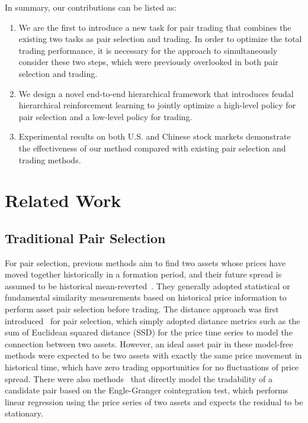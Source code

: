 \documentclass[sigconf]{acmart}
\begin{document}
In summary, our contributions can be listed as:
\begin{enumerate}
\item We are the first to introduce a new task for pair trading that combines the existing two tasks as pair selection and trading. In order to optimize the total trading performance, it is necessary for the approach to simultaneously consider these two steps, which were previously overlooked in both pair selection and trading.
\item We design a novel end-to-end hierarchical framework that introduces feudal hierarchical reinforcement learning to jointly optimize a high-level policy for pair selection and a low-level policy for trading.
\item Experimental results on both U.S. and Chinese stock markets demonstrate the effectiveness of our method compared with existing pair selection and trading methods.
\end{enumerate}
	
	
\section{Related Work}
\subsection{Traditional Pair Selection}
For pair selection, previous methods aim to find two assets whose prices have moved together historically in a formation period, and their future spread is assumed to be historical mean-reverted~\cite{Krauss2017}.
They generally adopted statistical or fundamental similarity measurements based on historical price information to perform asset pair selection before trading.
The distance approach was first introduced~\cite{gatev2006pairs,Huck2015PairsTA,Do2012ArePT,Chen2019EmpiricalIO,Pole2007StatisticalAA,Perlin2007MOA} for pair selection, which simply adopted distance metrics such as the sum of Euclidean squared distance (SSD) for the price time series to model the connection between two assets.
However, an ideal asset pair in these model-free methods were expected to be two assets with exactly the same price movement in historical time, which have zero trading opportunities for no fluctuations of price spread.
There were also methods~\cite{vidyamurthy2004pairs,Rad2015ThePO,Lin2006LossPI,Puspaningrum2010FindingTO,Elliott2005PairsT,Galenko2012TradingIT,Bertram2009AnalyticSF,Chen2014PairsTV} that directly model the tradability of a candidate pair based on the Engle-Granger cointegration test, which performs linear regression using the price series of two assets and expects the residual to be stationary.
\end{document}
